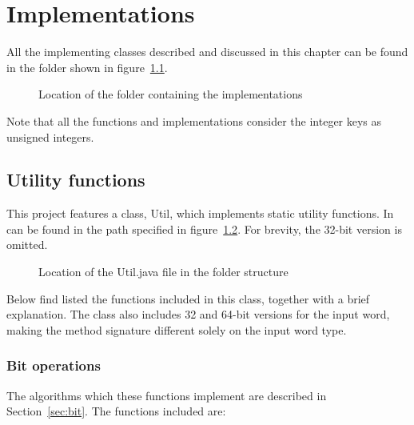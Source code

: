 \chapter{Implementations} \label{sec:implementationsChapter}

All the implementing classes described and discussed in this chapter can be found in the folder shown in figure~\ref{fig:implementationsFolderTree}.

\begin{figure}[H]
\caption{Location of the folder containing the implementations}
\label{fig:implementationsFolderTree}
\end{figure}

Note that all the functions and implementations consider the integer keys as unsigned integers.

\section{Utility functions} \label{sec:utilFuctionsImplementation}

This project features a class, {\ttfamily Util}, which implements static utility functions. In can be found in the path specified in figure~\ref{fig:utilFunctionsTree}.
For brevity, the 32-bit version is omitted.

\begin{figure}[H]
\caption{Location of the {\ttfamily Util.java} file in the folder structure}
\label{fig:utilFunctionsTree}
\end{figure}

Below find listed the functions included in this class, together with a brief explanation. The class also includes 32 and 64-bit versions for the input word, making the method signature different solely on the input word type.

\subsection{Bit operations}
The algorithms which these functions implement are described in Section~\ref{sec:bit}.
The functions included are:

